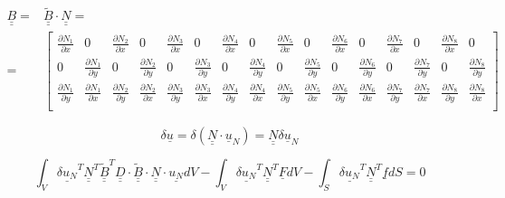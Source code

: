 \documentclass[a4paper]{jpconf}
\begin{document}
\setcounter{MaxMatrixCols}{20}
\begin{equation}
\begin{split}
\underline{\underline{B}}=&\underline{\underline{\widetilde{B}}}\cdot\underline{\underline{N}}=\\=&\begin{bmatrix}
\frac{\partial N_{1}}{\partial x}&0&\frac{\partial N_{2}}{\partial x}&0&\frac{\partial N_{3}}{\partial x}&0&\frac{\partial N_{4}}{\partial x}&0&\frac{\partial N_{5}}{\partial x}&0&\frac{\partial N_{6}}{\partial x}&0&\frac{\partial N_{7}}{\partial x}&0&\frac{\partial N_{8}}{\partial x}&0\\[7.5pt]
0&\frac{\partial N_{1}}{\partial y}&0&\frac{\partial N_{2}}{\partial y}&0&\frac{\partial N_{3}}{\partial y}&0&\frac{\partial N_{4}}{\partial y}&0&\frac{\partial N_{5}}{\partial y}&0&\frac{\partial N_{6}}{\partial y}&0&\frac{\partial N_{7}}{\partial y}&0&\frac{\partial N_{8}}{\partial y}\\[7.5pt]
\frac{\partial N_{1}}{\partial y}&\frac{\partial N_{1}}{\partial x}&\frac{\partial N_{2}}{\partial y}&\frac{\partial N_{2}}{\partial x}&\frac{\partial N_{3}}{\partial y}&\frac{\partial N_{3}}{\partial x}&\frac{\partial N_{4}}{\partial y}&\frac{\partial N_{4}}{\partial x}&\frac{\partial N_{5}}{\partial y}&\frac{\partial N_{5}}{\partial x}&\frac{\partial N_{6}}{\partial y}&\frac{\partial N_{6}}{\partial x}&\frac{\partial N_{7}}{\partial y}&\frac{\partial N_{7}}{\partial x}&\frac{\partial N_{8}}{\partial y}&\frac{\partial N_{8}}{\partial x}\\
\end{bmatrix}
\end{split}
\end{equation}

\begin{equation}
\delta\underline{u}=\delta\left(\underline{\underline{N}}\cdot\underline{u}_{N}\right)=\underline{\underline{N}}\delta\underline{u}_{N}
\end{equation}

\begin{equation}
\int_{V}\underline{\delta u_{N}}^{T}\underline{\underline{N}}^{T}\underline{\underline{\widetilde{B}}}^{T}\underline{\underline{D}}\cdot\underline{\underline{\widetilde{B}}}\cdot\underline{\underline{N}}\cdot\underline{u_{N}}dV-\int_{V}\underline{\delta u_{N}}^{T}\underline{\underline{N}}^{T}\underline{F}dV-\int_{S}\underline{\delta u_{N}}^{T}\underline{\underline{N}}^{T}\underline{f}dS=0
\end{equation}
\end{document}
